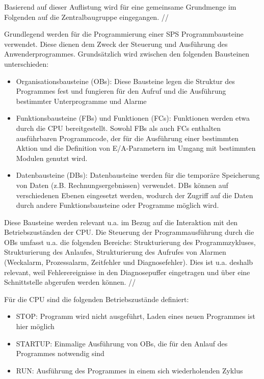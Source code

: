 Basierend auf dieser Auflistung wird für eine gemeinsame Grundmenge im Folgenden auf die Zentralbaugruppe eingegangen. //

Grundlegend werden für die Programmierung einer SPS Programmbausteine verwendet. Diese dienen dem Zweck der Steuerung und Ausführung des Anwenderprogrammes. Grundsätzlich wird zwischen den folgenden Bausteinen unterschieden:
\begin{itemize}
\item Organisationsbausteine (OBs): Diese Bausteine legen die Struktur des Programmes fest und fungieren für den Aufruf und die Ausführung bestimmter Unterprogramme und Alarme
\item Funktionsbausteine (FBs) und Funktionen (FCs): Funktionen werden etwa durch die CPU bereitgestellt. Sowohl FBs als auch FCs enthalten ausführbaren Programmcode, der für die Ausführung einer bestimmten Aktion und die Definition von E/A-Parametern im Umgang mit bestimmten Modulen genutzt wird. 
\item Datenbausteine (DBs): Datenbausteine werden für die temporäre Speicherung von Daten (z.B. Rechnungsergebnissen) verwendet. DBs können auf verschiedenen Ebenen eingesetzt werden, wodurch der Zugriff auf die Daten durch andere Funktionsbausteine oder Programme möglich wird.
\end{itemize}

Diese Bausteine werden relevant u.a. im Bezug auf die Interaktion mit den Betriebszuständen der CPU. Die Steuerung der Programmausführung durch die OBs umfasst u.a. die folgenden Bereiche: Strukturierung des Programmzykluses, Strukturierung des Anlaufes, Strukturierung des Aufrufes von Alarmen (Weckalarm, Prozessalarm, Zeitfehler und Diagnosefehler). Dies ist u.a. deshalb relevant, weil Fehlerereignisse in den Diagnosepuffer eingetragen und über eine Schnittstelle abgerufen werden können. //

Für die CPU sind die folgenden Betriebszustände definiert:  
\begin{itemize}
\item STOP: Programm wird nicht ausgeführt, Laden eines neuen Programmes ist hier möglich
\item STARTUP: Einmalige Ausführung von OBs, die für den Anlauf des Programmes notwendig sind
\item RUN: Ausführung des Programmes in einem sich wiederholenden Zyklus
\end{itemize}


